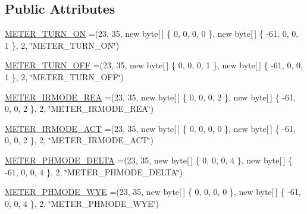 \subsection*{Public Attributes}
\begin{DoxyCompactItemize}
\item 
\hyperlink{enumcom_1_1eneri_1_1scorpio__metertool_1_1hardwarelayer_1_1_flags_passwords_ae6ecd35340e2a00595d2632ecd435f9a}{M\+E\+T\+E\+R\+\_\+\+T\+U\+R\+N\+\_\+\+ON} =(23, 35, new byte\mbox{[}$\,$\mbox{]} \{ 0, 0, 0, 0 \}, new byte\mbox{[}$\,$\mbox{]} \{ -\/61, 0, 0, 1 \}, 2, \char`\"{}M\+E\+T\+E\+R\+\_\+\+T\+U\+R\+N\+\_\+\+ON\char`\"{})
\item 
\hyperlink{enumcom_1_1eneri_1_1scorpio__metertool_1_1hardwarelayer_1_1_flags_passwords_abd5c56bc8ee751dd04e3a14990747c44}{M\+E\+T\+E\+R\+\_\+\+T\+U\+R\+N\+\_\+\+O\+FF} =(23, 35, new byte\mbox{[}$\,$\mbox{]} \{ 0, 0, 0, 1 \}, new byte\mbox{[}$\,$\mbox{]} \{ -\/61, 0, 0, 1 \}, 2, \char`\"{}M\+E\+T\+E\+R\+\_\+\+T\+U\+R\+N\+\_\+\+O\+FF\char`\"{})
\item 
\hyperlink{enumcom_1_1eneri_1_1scorpio__metertool_1_1hardwarelayer_1_1_flags_passwords_aa035a1ebc535f01a3bb43e9c24da895c}{M\+E\+T\+E\+R\+\_\+\+I\+R\+M\+O\+D\+E\+\_\+\+R\+EA} =(23, 35, new byte\mbox{[}$\,$\mbox{]} \{ 0, 0, 0, 2 \}, new byte\mbox{[}$\,$\mbox{]} \{ -\/61, 0, 0, 2 \}, 2, \char`\"{}M\+E\+T\+E\+R\+\_\+\+I\+R\+M\+O\+D\+E\+\_\+\+R\+EA\char`\"{})
\item 
\hyperlink{enumcom_1_1eneri_1_1scorpio__metertool_1_1hardwarelayer_1_1_flags_passwords_adc55053361cadc0fecabbe6367e361c4}{M\+E\+T\+E\+R\+\_\+\+I\+R\+M\+O\+D\+E\+\_\+\+A\+CT} =(23, 35, new byte\mbox{[}$\,$\mbox{]} \{ 0, 0, 0, 0 \}, new byte\mbox{[}$\,$\mbox{]} \{ -\/61, 0, 0, 2 \}, 2, \char`\"{}M\+E\+T\+E\+R\+\_\+\+I\+R\+M\+O\+D\+E\+\_\+\+A\+CT\char`\"{})
\item 
\hyperlink{enumcom_1_1eneri_1_1scorpio__metertool_1_1hardwarelayer_1_1_flags_passwords_af3bf7b464114eec23a41df34bd72992c}{M\+E\+T\+E\+R\+\_\+P\+H\+M\+O\+D\+E\+\_\+\+D\+E\+L\+TA} =(23, 35, new byte\mbox{[}$\,$\mbox{]} \{ 0, 0, 0, 4 \}, new byte\mbox{[}$\,$\mbox{]} \{ -\/61, 0, 0, 4 \}, 2, \char`\"{}M\+E\+T\+E\+R\+\_\+P\+H\+M\+O\+D\+E\+\_\+\+D\+E\+L\+TA\char`\"{})
\item 
\hyperlink{enumcom_1_1eneri_1_1scorpio__metertool_1_1hardwarelayer_1_1_flags_passwords_a786b8160d042090b09374baf7852913d}{M\+E\+T\+E\+R\+\_\+P\+H\+M\+O\+D\+E\+\_\+\+W\+YE} =(23, 35, new byte\mbox{[}$\,$\mbox{]} \{ 0, 0, 0, 0 \}, new byte\mbox{[}$\,$\mbox{]} \{ -\/61, 0, 0, 4 \}, 2, \char`\"{}M\+E\+T\+E\+R\+\_\+P\+H\+M\+O\+D\+E\+\_\+\+W\+YE\char`\"{})

\end{DoxyCompactItemize}
